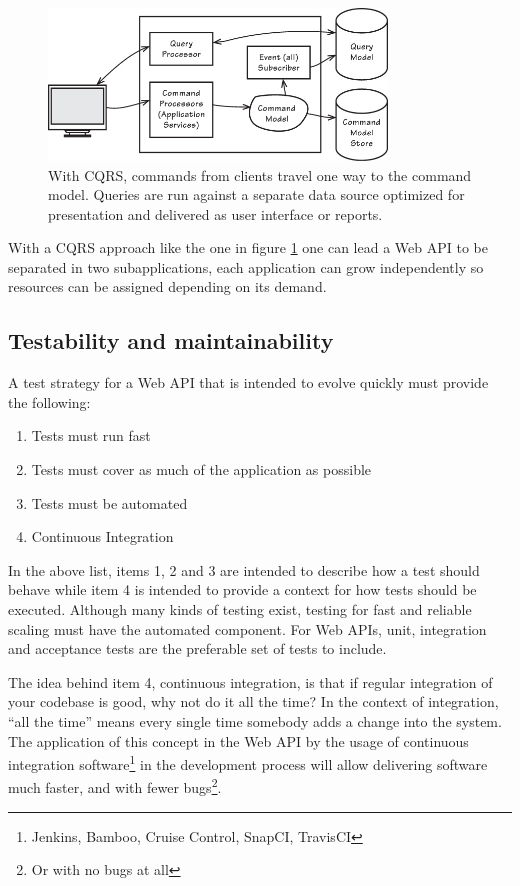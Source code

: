 \documentclass[10pt,article]{IEEEtran}
\begin{document}
\begin{figure}[h]
    \centering
    \includegraphics[width=9cm]{cqrs}
    \caption{With CQRS, commands from clients travel one way to the command model. Queries are run against a separate data source optimized for presentation and delivered as user interface or reports\cite{vernon:iddd}.}
    \label{fig:cqrs}
\end{figure}

With a CQRS approach like the one in figure \ref{fig:cqrs} one can lead a Web API to be separated in two subapplications, each application can grow independently so resources can be assigned depending on its demand. 

\subsection{Testability and maintainability}
A test strategy for a Web API that is intended to evolve quickly must provide the following:
\begin{enumerate}
    \item
    Tests must run fast
    \item
    Tests must cover as much of the application as possible
    \item
    Tests must be automated
    \item
    Continuous Integration
\end{enumerate}

In the above list, items 1, 2 and 3 are intended to describe how a test should behave while item 4 is intended to provide a context for how tests should be executed. Although many kinds of testing exist\cite{humble}, testing for fast and reliable scaling must have the automated component. For Web APIs, unit, integration and acceptance tests are the preferable set of tests to include.

The idea behind item 4, continuous integration, is that if regular integration of your codebase is good, why not do it all the time? In the context of integration, ``all the time'' means every single time somebody adds a change into the system\cite{beck:ci}. The application of this concept in the Web API by the usage of continuous integration software\footnote{Jenkins, Bamboo, Cruise Control, SnapCI, TravisCI} in the development process will allow delivering software much faster, and with fewer bugs\footnote{Or with no bugs at all}. 
\end{document}
